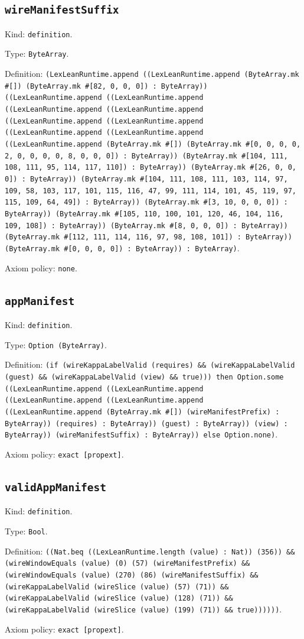 \documentclass[11pt]{article}
\begin{document}
\subsection*{\texttt{wireManifestSuffix}}
\noindent Kind: \texttt{definition}.\par
\noindent Type: \texttt{ByteArray}.\par
\noindent Definition: \texttt{(LexLeanRuntime.append ((LexLeanRuntime.append (ByteArray.mk \#[]) (ByteArray.mk \#[82, 0, 0, 0]) : ByteArray)) ((LexLeanRuntime.append ((LexLeanRuntime.append ((LexLeanRuntime.append ((LexLeanRuntime.append ((LexLeanRuntime.append ((LexLeanRuntime.append ((LexLeanRuntime.append ((LexLeanRuntime.append ((LexLeanRuntime.append (ByteArray.mk \#[]) (ByteArray.mk \#[0, 0, 0, 0, 2, 0, 0, 0, 0, 8, 0, 0, 0]) : ByteArray)) (ByteArray.mk \#[104, 111, 108, 111, 95, 114, 117, 110]) : ByteArray)) (ByteArray.mk \#[26, 0, 0, 0]) : ByteArray)) (ByteArray.mk \#[104, 111, 108, 111, 103, 114, 97, 109, 58, 103, 117, 101, 115, 116, 47, 99, 111, 114, 101, 45, 119, 97, 115, 109, 64, 49]) : ByteArray)) (ByteArray.mk \#[3, 10, 0, 0, 0]) : ByteArray)) (ByteArray.mk \#[105, 110, 100, 101, 120, 46, 104, 116, 109, 108]) : ByteArray)) (ByteArray.mk \#[8, 0, 0, 0]) : ByteArray)) (ByteArray.mk \#[112, 111, 114, 116, 97, 98, 108, 101]) : ByteArray)) (ByteArray.mk \#[0, 0, 0, 0]) : ByteArray)) : ByteArray)}.\par
\noindent Axiom policy: \texttt{none}.\par
\subsection*{\texttt{appManifest}}
\noindent Kind: \texttt{definition}.\par
\noindent Type: \texttt{Option (ByteArray)}.\par
\noindent Definition: \texttt{(if (wireKappaLabelValid (requires) \&\& (wireKappaLabelValid (guest) \&\& (wireKappaLabelValid (view) \&\& true))) then Option.some ((LexLeanRuntime.append ((LexLeanRuntime.append ((LexLeanRuntime.append ((LexLeanRuntime.append ((LexLeanRuntime.append (ByteArray.mk \#[]) (wireManifestPrefix) : ByteArray)) (requires) : ByteArray)) (guest) : ByteArray)) (view) : ByteArray)) (wireManifestSuffix) : ByteArray)) else Option.none)}.\par
\noindent Axiom policy: \texttt{exact [propext]}.\par
\subsection*{\texttt{validAppManifest}}
\noindent Kind: \texttt{definition}.\par
\noindent Type: \texttt{Bool}.\par
\noindent Definition: \texttt{((Nat.beq ((LexLeanRuntime.length (value) : Nat)) (356)) \&\& (wireWindowEquals (value) (0) (57) (wireManifestPrefix) \&\& (wireWindowEquals (value) (270) (86) (wireManifestSuffix) \&\& (wireKappaLabelValid (wireSlice (value) (57) (71)) \&\& (wireKappaLabelValid (wireSlice (value) (128) (71)) \&\& (wireKappaLabelValid (wireSlice (value) (199) (71)) \&\& true))))))}.\par
\noindent Axiom policy: \texttt{exact [propext]}.\par
\end{document}
